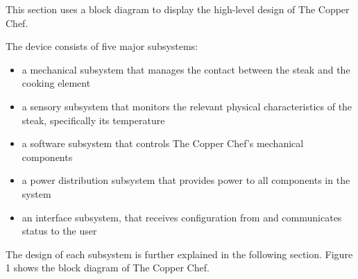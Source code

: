 \documentclass[11pt]{article}
\begin{document}
This section uses a block diagram to display the high-level design of The Copper Chef.

The device consists of five major subsystems:

\begin{itemize}[noitemsep, topsep=0pt, leftmargin=4em]
	\item a mechanical subsystem that manages the contact between the steak and the cooking element
	\item a sensory subsystem that monitors the relevant physical characteristics of the steak, specifically its temperature
  \item a software subsystem that controls The Copper Chef's mechanical components
  \item a power distribution subsystem that provides power to all components in the system
	\item an interface subsystem, that receives configuration from and communicates status to the user
\end{itemize}

The design of each subsystem is further explained in the following section.  
Figure 1 shows the block diagram of The Copper Chef.
\end{document}
